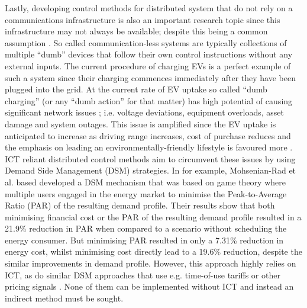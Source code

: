 Lastly, developing control methods for distributed system that do not rely on a communications infrastructure is also an important research topic since this infrastructure may not always be available; despite this being a common assumption \cite{Hatziargyriou2015}.
So called communication-less systems are typically collections of multiple ``dumb'' devices that follow their own control instructions without any external inputs.
The current procedure of charging EVs is a perfect example of such a system since their charging commences immediately after they have been plugged into the grid.
At the current rate of EV uptake so called ``dumb charging'' (or any ``dumb action'' for that matter) has high potential of causing significant network issues \cite{Hota2014, Liu2015a}; i.e. voltage deviations, equipment overloads, asset damage and system outages.
This issue is amplified since the EV uptake is anticipated to increase as driving range increases, cost of purchase reduces and the emphasis on leading an environmentally-friendly lifestyle is favoured more \cite{Shah2015}.
ICT reliant distributed control methods aim to circumvent these issues by using Demand Side Management (DSM) strategies.
In \cite{Mohsenian-Rad2010} for example, Mohsenian-Rad et al. based developed a DSM mechanism that was based on game theory where multiple users engaged in the energy market to minimise the Peak-to-Average Ratio (PAR) of the resulting demand profile.
Their results show that both minimising financial cost or the PAR of the resulting demand profile resulted in a 21.9\% reduction in PAR when compared to a scenario without scheduling the energy consumer.
But minimising PAR resulted in only a 7.31\% reduction in energy cost, whilst minimising cost directly lead to a 19.6\% reduction, despite the similar improvements in demand profile.
However, this approach highly relies on ICT, as do similar DSM approaches that use e.g. time-of-use tariffs \cite{Deilami2011, Surles2012} or other pricing signals \cite{Masoum2015}.
None of them can be implemented without ICT and instead an indirect method must be sought.


